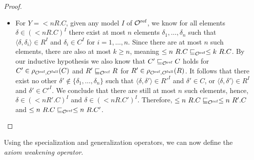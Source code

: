 \begin{proof}
\begin{itemize}
    \item For $Y ={} \less n R.C$, given any model $I$ of ${\mathcal{O}^\textnormal{ref}}$, we know for all elements $\delta \in (\less n R.C)^I$ there exist at most $n$ elements $\delta_1, \dots, \delta_n$ such that $\langle \delta, \delta_i \rangle \in R^I$ and $\delta_i \in C^I$ for $i = 1, \dots, n$. Since there are at most $n$ such elements, there are also at most $k \geq n$, meaning $\leq n~R.C \sqsubseteq_{\mathcal{O}^\textnormal{ref}} \leq k~R.C$. By our inductive hypothesis we also know that $C' \sqsubseteq_{\mathcal{O}^\textnormal{ref}} C$ holds for $C' \in \rho_{{\mathcal{O}^\textnormal{ref}},{\mathcal{O}^\textnormal{full}}}(C)$ and $R' \sqsubseteq_{\mathcal{O}^\textnormal{ref}} R$ for $R' \in \rho_{{\mathcal{O}^\textnormal{ref}},{\mathcal{O}^\textnormal{full}}}(R)$. It follows that there exist no other $\delta' \not\in \{ \delta_1, \dots, \delta_n \}$ such that $\langle \delta, \delta' \rangle \in R'^I$ and $\delta' \in C$, or $\langle \delta, \delta' \rangle \in R^I$ and $\delta' \in C'^I$. We conclude that there are still at most $n$ such elements, hence, $\delta \in (\less n R'.C)^I$ and $\delta \in (\less n R.C')^I$. Therefore, $\leq n~R.C \sqsubseteq_{\mathcal{O}^\textnormal{ref}} \leq n~R'.C$ and $\leq n~R.C \sqsubseteq_{\mathcal{O}^\textnormal{ref}} \leq n~R.C'$.
  \end{itemize}
\end{proof}

Using the specialization and generalization operators, we can now define the \emph{axiom weakening operator}.

